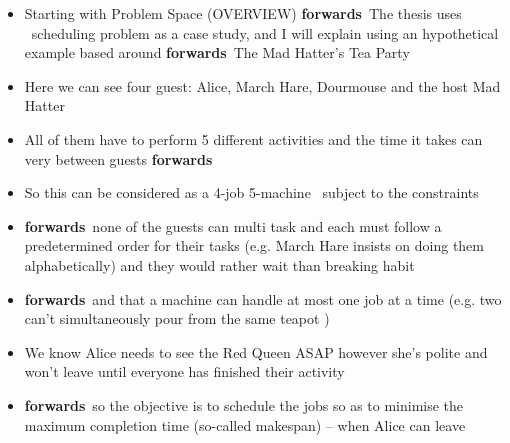 \documentclass[20pt,a4paper]{extarticle}
\newcommand{\bi}{\begin{itemize}\item }
\newcommand{\ei}{\end{itemize}}
\newcommand{\forward}{{\color{red}\textbf{forwards}}~}
\newcommand{\printpage}[1]{%
    \clearpage
    \begin{figure}[t!]\centering
    \fbox{\texttt{[image: handout.pdf]}}
    \end{figure}
}
\begin{document}
\printpage{4}
\bi Starting with Problem Space (OVERVIEW) \forward The thesis uses \jsp\ 
scheduling problem as a case study, and I will explain using an hypothetical 
example based around \forward The Mad Hatter's Tea Party
    \item Here we can see four guest: Alice, March Hare, Dourmouse and the host 
    Mad Hatter
    \item All of them have to perform 5 different activities and the time it 
    takes can very between guests 
    \forward \item So this can be considered as a 4-job 5-machine \jsp\ subject 
    to the constraints
    \item \forward none of the guests can multi task and each must follow a 
    predetermined order for their tasks (e.g. March Hare insists on doing them 
    alphabetically) and they would rather wait than breaking habit 
    \item \forward and that a machine can handle at most one job at a time 
    (e.g. 
    two can't simultaneously pour from the same teapot )
    \item We know Alice needs to see the Red Queen ASAP however she's polite 
    and won't leave until everyone has finished their activity
    \item \forward so the objective is to schedule the jobs so as to minimise 
    the 
    maximum completion time (so-called makespan) -- when Alice can leave
\ei
\end{document}

